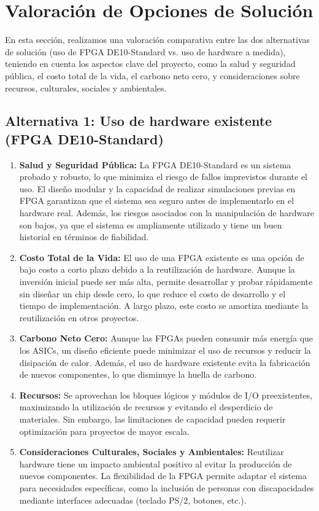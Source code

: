 \documentclass[conference]{IEEEtran}
\begin{document}
\section{Valoración de Opciones de Solución}

En esta sección, realizamos una valoración comparativa entre las dos alternativas de solución (uso de FPGA DE10-Standard vs. uso de hardware a medida), teniendo en cuenta los aspectos clave del proyecto, como la salud y seguridad pública, el costo total de la vida, el carbono neto cero, y consideraciones sobre recursos, culturales, sociales y ambientales.

\subsection{Alternativa 1: Uso de hardware existente (FPGA DE10-Standard)}

\begin{enumerate}
	\item \textbf{Salud y Seguridad Pública:} La FPGA DE10-Standard es un sistema probado y robusto, lo que minimiza el riesgo de fallos imprevistos durante el uso. El diseño modular y la capacidad de realizar simulaciones previas en FPGA garantizan que el sistema sea seguro antes de implementarlo en el hardware real. Además, los riesgos asociados con la manipulación de hardware son bajos, ya que el sistema es ampliamente utilizado y tiene un buen historial en términos de fiabilidad.
	
	\item \textbf{Costo Total de la Vida:} El uso de una FPGA existente es una opción de bajo costo a corto plazo debido a la reutilización de hardware. Aunque la inversión inicial puede ser más alta, permite desarrollar y probar rápidamente sin diseñar un chip desde cero, lo que reduce el costo de desarrollo y el tiempo de implementación. A largo plazo, este costo se amortiza mediante la reutilización en otros proyectos.
	
	\item \textbf{Carbono Neto Cero:} Aunque las FPGAs pueden consumir más energía que los ASICs, un diseño eficiente puede minimizar el uso de recursos y reducir la disipación de calor. Además, el uso de hardware existente evita la fabricación de nuevos componentes, lo que disminuye la huella de carbono.
	
	\item \textbf{Recursos:} Se aprovechan los bloques lógicos y módulos de I/O preexistentes, maximizando la utilización de recursos y evitando el desperdicio de materiales. Sin embargo, las limitaciones de capacidad pueden requerir optimización para proyectos de mayor escala.
	
	\item \textbf{Consideraciones Culturales, Sociales y Ambientales:} Reutilizar hardware tiene un impacto ambiental positivo al evitar la producción de nuevos componentes. La flexibilidad de la FPGA permite adaptar el sistema para necesidades específicas, como la inclusión de personas con discapacidades mediante interfaces adecuadas (teclado PS/2, botones, etc.).
\end{enumerate}
\end{document}
